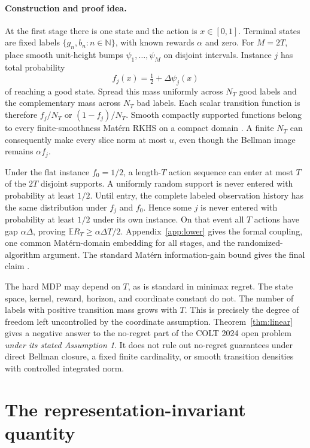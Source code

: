 \documentclass{article}
\newcommand{\N}{\mathbb N}
\newcommand{\E}{\mathbb E}
\begin{document}
\paragraph{Construction and proof idea.}
At the first stage there is one state and the action is $x\in[0,1]$. Terminal states are fixed labels $\{g_n,b_n:n\in\N\}$, with known rewards $\alpha$ and zero. For $M=2T$, place smooth unit-height bumps $\psi_1,\ldots,\psi_M$ on disjoint intervals. Instance $j$ has total probability
\begin{equation}
 f_j(x)=\tfrac12+\Delta\psi_j(x)
 \label{eq:bump-mean}
\end{equation}
of reaching a good state. Spread this mass uniformly across $N_T$ good labels and the complementary mass across $N_T$ bad labels. Each scalar transition function is therefore $f_j/N_T$ or $(1-f_j)/N_T$. Smooth compactly supported functions belong to every finite-smoothness Mat\'ern RKHS on a compact domain \citep{wendland2005scattered,kanagawa2018review}. A finite $N_T$ can consequently make every slice norm at most $u$, even though the Bellman image remains $\alpha f_j$.

Under the flat instance $f_0=1/2$, a length-$T$ action sequence can enter at most $T$ of the $2T$ disjoint supports. A uniformly random support is never entered with probability at least $1/2$. Until entry, the complete labeled observation history has the same distribution under $f_j$ and $f_0$. Hence some $j$ is never entered with probability at least $1/2$ under its own instance. On that event all $T$ actions have gap $\alpha\Delta$, proving $\E R_T\geq\alpha\Delta T/2$. Appendix~\ref{app:lower} gives the formal coupling, one common Mat\'ern-domain embedding for all stages, and the randomized-algorithm argument. The standard Mat\'ern information-gain bound gives the final claim \citep{vakili2021information,janz2020matern}.

The hard MDP may depend on $T$, as is standard in minimax regret. The state space, kernel, reward, horizon, and coordinate constant do not. The number of labels with positive transition mass grows with $T$. This is precisely the degree of freedom left uncontrolled by the coordinate assumption. Theorem~\ref{thm:linear} gives a negative answer to the no-regret part of the COLT 2024 open problem \emph{under its stated Assumption 1}. It does not rule out no-regret guarantees under direct Bellman closure, a fixed finite cardinality, or smooth transition densities with controlled integrated norm.

\section{The representation-invariant quantity}
\label{sec:radius}
\end{document}
